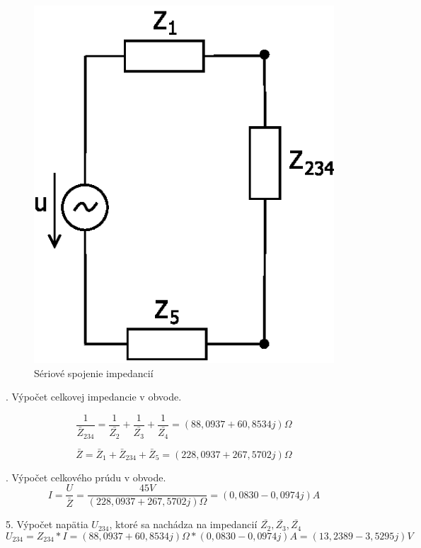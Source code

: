 \documentclass[a4paper,12pt]{article}
\begin{document}
\begin{figure}[!htb]
\centering
\includegraphics[scale=1.0]{p4/p3.eps}
\caption{Sériové spojenie impedancií}
\end{figure}

. Výpočet celkovej impedancie v obvode.

\begin{equation}
\frac{1}{\bar{Z}_{234}} = \frac{1}{\bar{Z_2}} + \frac{1}{\bar{Z_3}} + \frac{1}{\bar{Z_4}} = (88,0937 + 60,8534j)\Omega
\end{equation}

\begin{equation}
\bar{Z} = \bar{Z}_1 + \bar{Z}_{234} + \bar{Z}_5 = (228,0937 + 267,5702j)\Omega
\end{equation}

. Výpočet celkového prúdu v obvode.
\begin{equation}
I = \frac{U}{\bar{Z}} = \frac{45V}{(228,0937 + 267,5702j)\Omega} = (0,0830 -0,0974j)A
\end{equation}

\bigskip
5. Výpočet napätia $U_{234}$, ktoré sa nachádza na impedancií $\bar{Z_2},  \bar{Z_3}, \bar{Z_4}$
\begin{equation}
U_{234} = Z_{234} * I = (88,0937 + 60,8534j)\Omega * (0,0830 -0,0974j)A = (13,2389 - 3,5295j)V
\end{equation}
\end{document}
